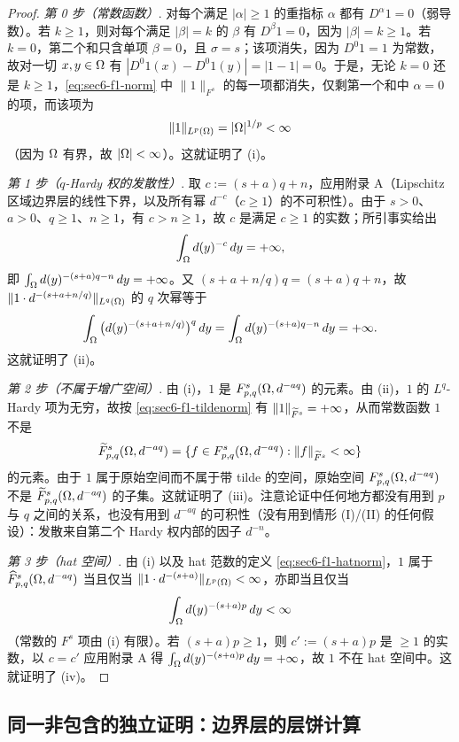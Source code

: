 \begin{proof}
\emph{第 0 步（常数函数）}. 对每个满足 $|\alpha|\ge1$ 的重指标 $\alpha$ 都有 $D^\alpha 1=0$（弱导数）。若 $k\ge1$，则对每个满足 $|\beta|=k$ 的 $\beta$ 有 $D^\beta 1=0$，因为 $|\beta|=k\ge1$。若 $k=0$，第二个和只含单项 $\beta=0$，且 $\sigma=s$；该项消失，因为 $D^0 1=1$ 为常数，故对一切 $x,y\in\Omega$ 有 $|D^0 1(x)-D^0 1(y)|=|1-1|=0$。于是，无论 $k=0$ 还是 $k\ge1$，\eqref{eq:sec6-f1-norm} 中 $\|1\|_{F^s}$ 的每一项都消失，仅剩第一个和中 $\alpha=0$ 的项，而该项为
\[
  \|1\|_{L^p(\Omega)}=|\Omega|^{1/p}<\infty
\]
（因为 $\Omega$ 有界，故 $|\Omega|<\infty$）。这就证明了 (i)。

\emph{第 1 步（$q$-Hardy 权的发散性）}. 取 $c:=(s+a)q+n$，应用附录 A（Lipschitz 区域边界层的线性下界，以及所有幂 $d^{-c}$（$c\ge1$）的不可积性）。由于 $s>0$、$a>0$、$q\ge1$、$n\ge1$，有 $c>n\ge1$，故 $c$ 是满足 $c\ge1$ 的实数；所引事实给出
\[
  \int_\Omega d(y)^{-c}\,dy=+\infty,
\]
即 $\int_\Omega d(y)^{-(s+a)q-n}\,dy=+\infty$。又 $(s+a+n/q)q=(s+a)q+n$，故 $\|1\cdot d^{-(s+a+n/q)}\|_{L^q(\Omega)}$ 的 $q$ 次幂等于
\[
  \int_\Omega\big(d(y)^{-(s+a+n/q)}\big)^q\,dy=\int_\Omega d(y)^{-(s+a)q-n}\,dy=+\infty.
\]
这就证明了 (ii)。

\emph{第 2 步（不属于增广空间）}. 由 (i)，$1$ 是 $F^{s}_{p,q}(\Omega,d^{-aq})$ 的元素。由 (ii)，$1$ 的 $L^q$-Hardy 项为无穷，故按 \eqref{eq:sec6-f1-tildenorm} 有 $\|1\|_{\widetilde F^s}=+\infty$，从而常数函数 $1$ 不是
\[
  \widetilde F^{s}_{p,q}(\Omega,d^{-aq})=\{f\in F^{s}_{p,q}(\Omega,d^{-aq}):\|f\|_{\widetilde F^s}<\infty\}
\]
的元素。由于 $1$ 属于原始空间而不属于带 tilde 的空间，原始空间 $F^{s}_{p,q}(\Omega,d^{-aq})$ 不是 $\widetilde F^{s}_{p,q}(\Omega,d^{-aq})$ 的子集。这就证明了 (iii)。注意论证中任何地方都没有用到 $p$ 与 $q$ 之间的关系，也没有用到 $d^{-aq}$ 的可积性（没有用到情形 (I)/(II) 的任何假设）：发散来自第二个 Hardy 权内部的因子 $d^{-n}$。

\emph{第 3 步（hat 空间）}. 由 (i) 以及 hat 范数的定义 \eqref{eq:sec6-f1-hatnorm}，$1$ 属于 $\widehat F^{s}_{p,q}(\Omega,d^{-aq})$ 当且仅当 $\|1\cdot d^{-(s+a)}\|_{L^p(\Omega)}<\infty$，亦即当且仅当
\[
  \int_\Omega d(y)^{-(s+a)p}\,dy<\infty
\]
（常数的 $F^s$ 项由 (i) 有限）。若 $(s+a)p\ge1$，则 $c':=(s+a)p$ 是 $\ge1$ 的实数，以 $c=c'$ 应用附录 A 得 $\int_\Omega d(y)^{-(s+a)p}\,dy=+\infty$，故 $1$ 不在 hat 空间中。这就证明了 (iv)。
\end{proof}

\subsection{同一非包含的独立证明：边界层的层饼计算}

